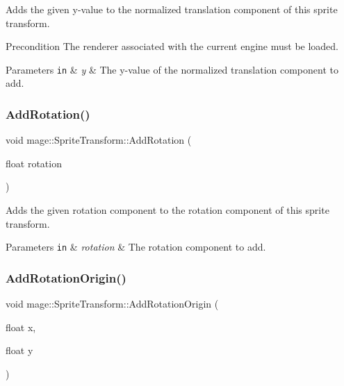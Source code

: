 Adds the given y-\/value to the normalized translation component of this sprite transform.

\begin{DoxyPrecond}{Precondition}
The renderer associated with the current engine must be loaded. 
\end{DoxyPrecond}

\begin{DoxyParams}[1]{Parameters}
\mbox{\tt in}  & {\em y} & The y-\/value of the normalized translation component to add. \\
\hline
\end{DoxyParams}
\hypertarget{structmage_1_1_sprite_transform_a04ac9e579968e80b4e42ad6224ff78a5}{}\label{structmage_1_1_sprite_transform_a04ac9e579968e80b4e42ad6224ff78a5} 
\subsubsection{\texorpdfstring{Add\+Rotation()}{AddRotation()}}
{\footnotesize\ttfamily void mage\+::\+Sprite\+Transform\+::\+Add\+Rotation (\begin{DoxyParamCaption}\item[{float}]{rotation }\end{DoxyParamCaption})\hspace{0.3cm}{\ttfamily [noexcept]}}

Adds the given rotation component to the rotation component of this sprite transform.


\begin{DoxyParams}[1]{Parameters}
\mbox{\tt in}  & {\em rotation} & The rotation component to add. \\
\hline
\end{DoxyParams}
\hypertarget{structmage_1_1_sprite_transform_aeacf6d861af27156a3673ac7d340ce39}{}\label{structmage_1_1_sprite_transform_aeacf6d861af27156a3673ac7d340ce39} 
\subsubsection{\texorpdfstring{Add\+Rotation\+Origin()}{AddRotationOrigin()}\hspace{0.1cm}{\footnotesize\ttfamily [1/3]}}
{\footnotesize\ttfamily void mage\+::\+Sprite\+Transform\+::\+Add\+Rotation\+Origin (\begin{DoxyParamCaption}\item[{float}]{x,  }\item[{float}]{y }\end{DoxyParamCaption})\hspace{0.3cm}{\ttfamily [noexcept]}}

